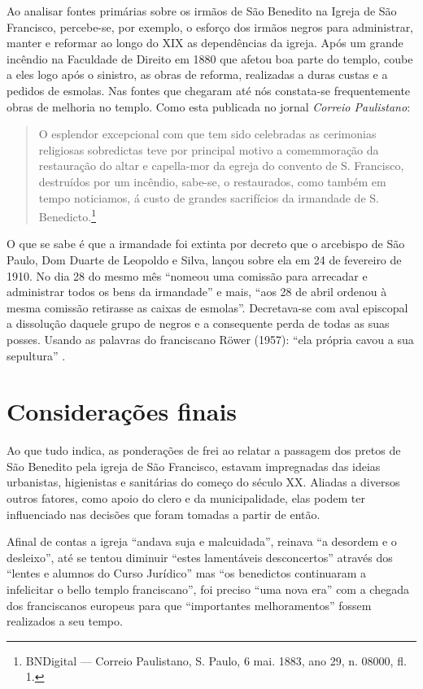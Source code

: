 \begin{refsection}
    Ao analisar fontes primárias sobre os irmãos de São Benedito na Igreja de São Francisco, percebe-se, por exemplo, o esforço dos irmãos negros para administrar, manter e reformar ao longo do XIX as dependências da igreja. Após um grande incêndio na Faculdade de Direito em 1880 que afetou boa parte do templo, coube a eles logo após o sinistro, as obras de reforma, realizadas a duras custas e a pedidos de esmolas. Nas fontes que chegaram até nós constata-se frequentemente obras de melhoria no templo. Como esta publicada no jornal \textit{Correio Paulistano}:

    \begin{quotation}
        O esplendor excepcional com que tem sido celebradas as cerimonias religiosas sobredictas teve por principal motivo a comemmoração da restauração do altar e capella-mor da egreja do convento de S. Francisco, destruídos por um incêndio, sabe-se, o restaurados, como também em tempo noticiamos, á custo de grandes sacrifícios da irmandade de S. Benedicto.\footnote{BNDigital --- Correio Paulistano, S. Paulo, 6 mai. 1883, ano 29, n. 08000, fl. 1.}
    \end{quotation}


    O que se sabe é que a irmandade foi extinta por decreto que o arcebispo de São Paulo, Dom Duarte de Leopoldo e Silva, lançou sobre ela em 24 de fevereiro de 1910. No dia 28 do mesmo mês ``nomeou uma comissão para arrecadar e administrar todos os bens da irmandade'' e mais, ``aos 28 de abril ordenou à mesma comissão retirasse as caixas de esmolas''. Decretava-se com aval episcopal a dissolução daquele grupo de negros e a consequente perda de todas as suas posses. Usando as palavras do franciscano Röwer (1957): ``ela própria cavou a sua sepultura'' \cite[p.~120]{Rower1957Paginas}.

    \section{Considerações finais}

    Ao que tudo indica, as ponderações de frei \textcite{Rower1922Provincia} ao relatar a passagem dos pretos de São Benedito pela igreja de São Francisco, estavam impregnadas das ideias urbanistas, higienistas e sanitárias do começo do século XX. Aliadas a diversos outros fatores, como apoio do clero e da municipalidade, elas podem ter influenciado nas decisões que foram tomadas a partir de então.  

    Afinal de contas a igreja ``andava suja e malcuidada'', reinava ``a desordem e o desleixo'', até se tentou diminuir ``estes lamentáveis desconcertos'' através dos ``lentes e alumnos do Curso Jurídico'' mas ``os benedictos continuaram a infelicitar o bello templo franciscano'', foi preciso ``uma nova era'' com a chegada dos franciscanos europeus para que ``importantes melhoramentos'' fossem realizados a seu tempo.


\end{refsection}
